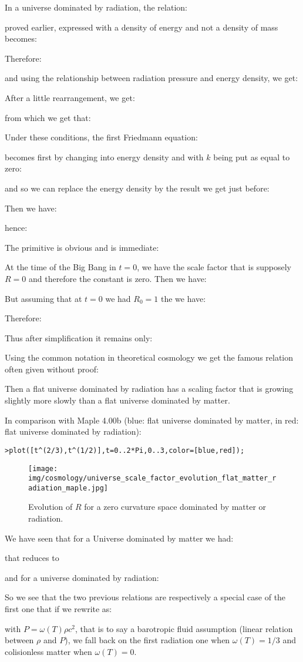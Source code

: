 	In a universe dominated by radiation, the relation:
	
	 proved earlier, expressed with a density of energy and not a density of mass becomes:
	
	Therefore:
	
	and using the relationship between radiation pressure and energy density, we get:
	
	After a little rearrangement, we get:
	
	from which we get that:
	
	Under these conditions, the first Friedmann equation:
	
	becomes first by changing into energy density and with $k$ being put as equal to zero:
	
	and so we can replace the energy density by the result we get just before:
	
	Then we have:
	
	hence:
	
	The primitive is obvious and is immediate:
	
	At the time of the Big Bang in $t=0$, we have the scale factor that is supposely $R=0$ and therefore the constant is zero. Then we have:
	
	But assuming that at $t=0$ we had $R_0=1$ the we have:
	
	Therefore:
	
	Thus after simplification it remains only:
	
	Using the common notation in theoretical cosmology we get the famous relation often given without proof:
	
	Then a flat universe dominated by radiation has a scaling factor that is growing slightly more slowly than a flat universe dominated by matter.

	In comparison with Maple 4.00b (blue: flat universe dominated by matter, in red: flat universe dominated by radiation):

	\texttt{>plot([t\string^(2/3),t\string^(1/2)],t=0..2*Pi,0..3,color=[blue,red]);}\\
	\begin{figure}[H]
		\begin{center}
		\texttt{[image: img/cosmology/universe\_scale\_factor\_evolution\_flat\_matter\_radiation\_maple.jpg]}
		\end{center}	
		\caption[]{Evolution of $R$ for a zero curvature space dominated by matter or radiation.}
	\end{figure} 
	\begin{tcolorbox}[title=Remark,colframe=black,arc=10pt]
	We have seen that for a Universe dominated by matter we had:
	
	that reduces to
	
	and for a universe dominated by radiation:
	
	So we see that the two previous relations are respectively a special case of the first one that if we rewrite as:
	
	with $P=\omega(T)\rho c^2$, that is to say a barotropic fluid assumption (linear relation between $\rho$ and $P$), we fall back on the first radiation one when $\omega(T)=1/3$ and colisionless matter when $\omega(T)=0$.
	\end{tcolorbox}
	
